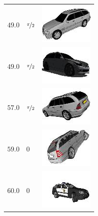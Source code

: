 \documentclass{llncs}
\begin{document}
\begin{longtable}{p{25mm}p{35mm}c}
  	\centering $49.0$ & \centering $\nicefrac{\pi}{2}$ & \begin{minipage}{40mm}{\includegraphics{models/1c5a350ea0f55f793fbce9ec40e1f047.jpg}}\end{minipage}\\
  	\centering $49.0$ & \centering $\nicefrac{\pi}{2}$ & \begin{minipage}{40mm}{\includegraphics{models/875bc6efc7f33c052e877e82c90c24d.jpg}}\end{minipage}\\
  	\centering $57.0$ & \centering $\nicefrac{\pi}{2}$ & \begin{minipage}{40mm}{\includegraphics{models/eb5a5eb751cca94a3fbce9ec40e1f047.jpg}}\end{minipage}\\
  	\centering $59.0$ & \centering $0$ & \begin{minipage}{40mm}{\includegraphics{models/a0c60115f83f1f77b1bb46d2556ba67d.jpg}}\end{minipage}\\
  	\centering $60.0$ & \centering $0$ & \begin{minipage}{40mm}{\includegraphics{models/5bab0881b7a18b12733269057ed164db.jpg}}\end{minipage}\\
  \end{longtable}
\end{document}
